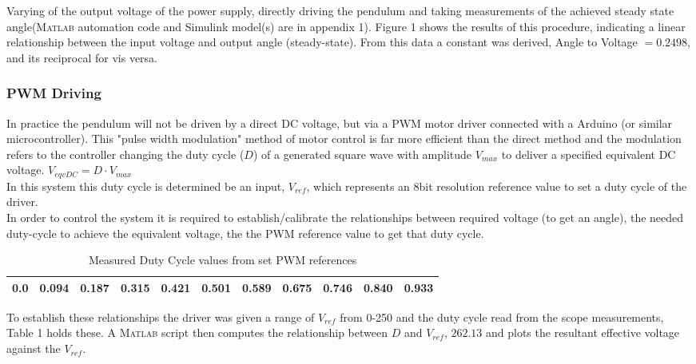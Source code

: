 \documentclass[a4paper,11pt]{article}
\newcommand{\matlab}{\textsc{Matlab }} %
\begin{document}
Varying of the output voltage of the power supply, directly driving the pendulum and taking measurements of the achieved steady state angle(\matlab automation code and Simulink model(s) are in appendix 1). Figure 1 shows the results of this procedure, indicating a linear relationship between the input voltage and output angle (steady-state). From this data a constant was derived, Angle to Voltage $=0.2498$, and its reciprocal for vis versa. 

\subsubsection{PWM Driving}
In practice the pendulum will not be driven by a direct DC voltage, but via a PWM motor driver connected with a Arduino (or similar microcontroller). This "pulse width modulation" method of motor control is far more efficient than the direct method and the modulation refers to the controller changing the duty cycle ($D$) of a generated square wave with amplitude $V_{max}$ to deliver a specified equivalent DC voltage. $V_{eqvDC} = D{\cdot}V_{max}$\\

In this system this duty cycle is determined be an input, $V_{ref}$, which represents an 8bit resolution reference value to set a duty cycle of the driver.\\

In order to control the system it is required to establish/calibrate the relationships between required voltage (to get an angle), the needed duty-cycle to achieve the equivalent voltage, the the PWM reference value to get that duty cycle.

\begin{table}[h]
        \centering
        \begin{tabular}{|l|l|l|l|l|l|l|l|l|l|l|}
        \hline
        0.0 & 0.094 & 0.187 & 0.315 & 0.421 & 0.501 & 0.589 & 0.675 & 0.746 & 0.840 & 0.933 \\ \hline
        \end{tabular}
        \caption{Measured Duty Cycle values from set PWM references}
\end{table}

To establish these relationships the driver was given a range of $V_{ref}$ from 0-250 and the duty cycle read from the scope measurements, Table 1 holds these. A \matlab script then computes the relationship between $D$ and $V_{ref}$, $262.13$ and plots the resultant effective voltage against the $V_{ref}$.
\end{document}
